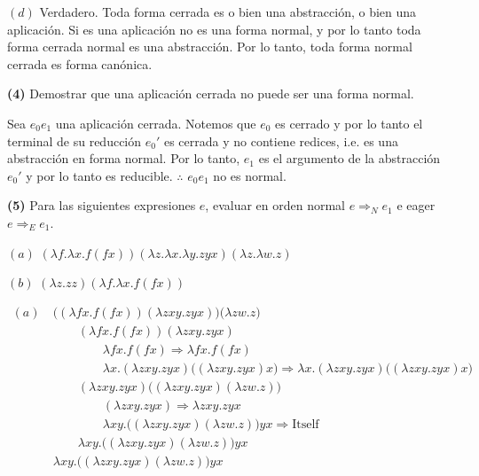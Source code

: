 \documentclass[article, 12pt]{article}
\begin{document}
$(d)$ Verdadero. Toda forma cerrada es o bien una abstracción, o bien una
aplicación. Si es una aplicación no es una forma normal, y por lo tanto toda
forma cerrada normal es una abstracción. Por lo tanto, toda forma normal cerrada
es forma canónica.

\pagebreak 

\begin{myframe}
  \textbf{(4)} Demostrar que una aplicación cerrada no puede ser una forma normal.
\end{myframe}


Sea $e_0e_1$ una aplicación cerrada. Notemos que $e_0$ es cerrado y por lo tanto
el terminal de su reducción $e_0'$ es cerrada y no contiene redices, i.e. es una
abstracción en forma normal. Por lo tanto, $e_1$ es el argumento de la
abstracción $e_0'$ y por lo tanto es reducible. $\therefore $ $e_0 e_1$ no es
normal.

\pagebreak 

\begin{myframe}
  \textbf{(5)} Para las siguientes expresiones $e$, evaluar en orden normal 
  $e \Rightarrow_N e_1$ e eager $e \Rightarrow_E e_1$.

  $(a)$ $\left( \lambda f. \lambda x. f ( fx ) \right)\left( \lambda z. \lambda x.
  \lambda y. zyx \right) \left( \lambda z. \lambda w. z \right)   $

  $(b)$ $\left( \lambda z . zz \right) \left( \lambda f.\lambda x. f(fx) \right) $ 
\end{myframe}

\begin{align*}
  (a) ~ 
  &\Big( (\lambda fx.f(fx)) (\lambda zxy.zyx) \Big) \Big( \lambda zw. z \Big) \\ 
  &\qquad (\lambda fx.f(fx)) (\lambda zxy.zyx) \\ 
  &\qquad \qquad \lambda fx. f(fx) \Rightarrow \lambda fx. f(fx)\\
  &\qquad \qquad \lambda x.(\lambda zxy.zyx)\big( (\lambda zxy.zyx)x \big)
  \Rightarrow \lambda x.(\lambda  zxy . zyx)\big( (\lambda zxy . zyx)x \big)\\ 
  &\qquad (\lambda zxy.zyx)\big( (\lambda zxy.zyx)(\lambda zw.z) \big)\\
  &\qquad \qquad  (\lambda zxy.zyx) \Rightarrow \lambda zxy. zyx \\ 
  & \qquad \qquad \lambda xy.\Big( (\lambda zxy. zyx)(\lambda zw.z) \Big)yx
  \Rightarrow \text{Itself} \\ 
  & \qquad \lambda xy.\Big( (\lambda zxy. zyx)(\lambda zw.z) \Big)yx \\
  & \lambda xy.\Big( (\lambda zxy. zyx)(\lambda zw.z) \Big)yx 
\end{align*}
\end{document}
